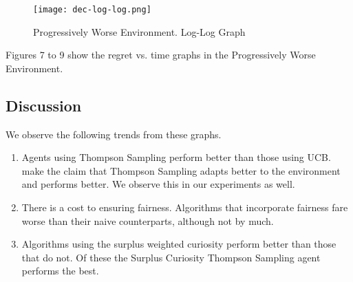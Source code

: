 \begin{figure}[h!]
    \centering
    \texttt{[image: dec-log-log.png]}
    \caption{Progressively Worse Environment. Log-Log Graph}
    \label{fig:d3}
\end{figure}

Figures 7 to 9 show the regret vs. time graphs in the Progressively Worse Environment.

\subsection{Discussion}
We observe the following trends from these graphs.

\begin{enumerate}
    \item Agents using Thompson Sampling perform better than those using UCB.  make the claim that Thompson Sampling adapts better to the environment and performs better. We observe this in our experiments as well.
    \item There is a cost to ensuring fairness. Algorithms that incorporate fairness fare worse than their naive counterparts, although not by much. 
    \item Algorithms using the surplus weighted curiosity perform better than those that do not. Of these the Surplus Curiosity Thompson Sampling agent performs the best.
\end{enumerate}

